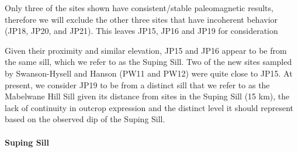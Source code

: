\documentclass{article}
\begin{document}
    Only three of the sites shown have consistent/stable paleomagnetic
results, therefore we will exclude the other three sites that have
incoherent behavior (JP18, JP20, and JP21). This leaves JP15, JP16 and
JP19 for consideration

Given their proximity and similar elevation, JP15 and JP16 appear to be
from the same sill, which we refer to as the Suping Sill. Two of the new
sites sampled by Swanson-Hysell and Hanson (PW11 and PW12) were quite
close to JP15. At present, we consider JP19 to be from a distinct sill
that we refer to as the Mabelwane Hill Sill given its distance from
sites in the Suping Sill (15 km), the lack of continuity in outcrop
expression and the distinct level it should represent based on the
observed dip of the Suping Sill.

    \paragraph{Suping Sill}\label{suping-sill}
\end{document}
